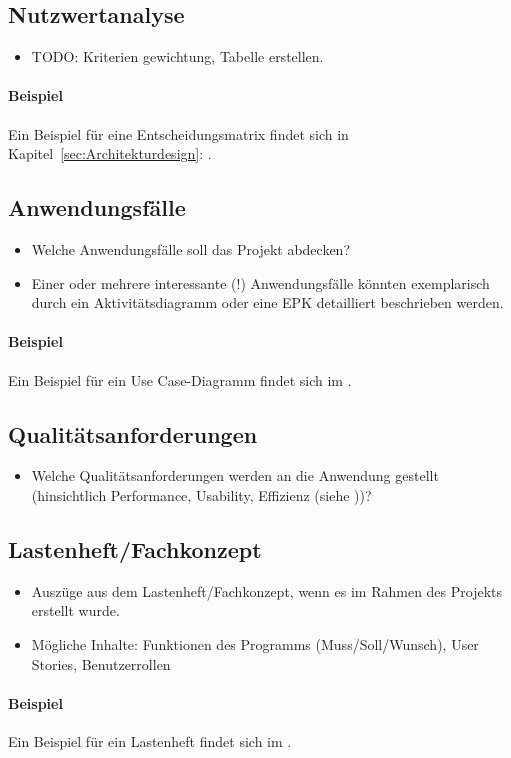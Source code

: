 \subsection{Nutzwertanalyse}
\label{sec:Nutzwertanalyse}
\begin{itemize}
	\item TODO: Kriterien gewichtung, Tabelle erstellen.
\end{itemize}

\paragraph{Beispiel}
Ein Beispiel für eine Entscheidungsmatrix findet sich in Kapitel~\ref{sec:Architekturdesign}: .


\subsection{Anwendungsfälle}
\label{sec:Anwendungsfaelle}
\begin{itemize}
	\item Welche Anwendungsfälle soll das Projekt abdecken?
	\item Einer oder mehrere interessante (!) Anwendungsfälle könnten exemplarisch durch ein Aktivitätsdiagramm oder eine \ac{EPK} detailliert beschrieben werden. 
\end{itemize}

\paragraph{Beispiel}
Ein Beispiel für ein Use Case-Diagramm findet sich im .


\subsection{Qualitätsanforderungen}
\label{sec:Qualitaetsanforderungen}
\begin{itemize}
	\item Welche Qualitätsanforderungen werden an die Anwendung gestellt (\zB hinsichtlich Performance, Usability, Effizienz \etc (siehe \citet{ISO9126}))?
\end{itemize}


\subsection{Lastenheft/Fachkonzept}
\label{sec:Lastenheft}
\begin{itemize}
	\item Auszüge aus dem Lastenheft/Fachkonzept, wenn es im Rahmen des Projekts erstellt wurde.
	\item Mögliche Inhalte: Funktionen des Programms (Muss/Soll/Wunsch), User Stories, Benutzerrollen
\end{itemize}

\paragraph{Beispiel}
Ein Beispiel für ein Lastenheft findet sich im . 
